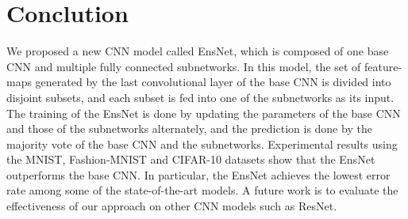 \documentclass[a4j]{article}
\begin{document}
\section{Conclution}
We proposed a new CNN model called EnsNet, which is composed of one base CNN and multiple fully connected subnetworks. In this model, the set of feature-maps generated by the last convolutional layer of the base CNN is divided into disjoint subsets, and each subset is fed into one of the subnetworks as its input. The training of the EnsNet is done by updating the parameters of the base CNN and those of the subnetworks alternately, and the prediction is done by the majority vote of the base CNN and the subnetworks. Experimental results using the MNIST, Fashion-MNIST and CIFAR-10 datasets show that the EnsNet outperforms the base CNN. In particular, the EnsNet achieves the lowest error rate among some of the state-of-the-art models. A future work is to evaluate the effectiveness of our approach on other CNN models such as ResNet\cite{ResNet}.



\end{document}
